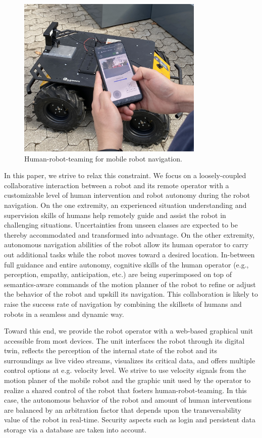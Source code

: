 \documentclass[letterpaper, 10 pt, conference]{ieeeconf}  %
\begin{document}
\begin{figure}[t]
	\centerline{\includegraphics[width=8.9cm]{images/galaxycontrol.jpg}}
	\caption{Human-robot-teaming for mobile robot navigation.}
	\label{fig:galaxycontrol}
\end{figure}


In this paper, we strive to relax this constraint. We focus on a loosely-coupled collaborative interaction between a  robot and its remote operator  with a customizable level of human intervention and robot autonomy during the robot navigation. On the one extremity, an experienced situation understanding and  supervision skills of humans help remotely guide and assist the robot in challenging situations. Uncertainties from unseen classes are expected to be thereby accommodated and transformed into advantage. On the other extremity, autonomous navigation abilities of the robot allow its human operator to carry out additional tasks while the robot moves toward a desired location. In-between full guidance and entire autonomy, cognitive skills of the human operator (e.g., perception, empathy, anticipation, etc.) are being superimposed on top of semantics-aware commands of the motion planner of the robot to refine or adjust the behavior of the robot and upskill its navigation. This collaboration is likely to raise the success rate of  navigation by combining the skillsets of humans and robots in a seamless and dynamic way.



Toward this end, we  provide the robot operator with a web-based graphical unit accessible from most devices. The unit interfaces the robot through its digital twin, reflects the perception of the internal state of the robot and its surroundings as live video streams, visualizes its critical data, and offers multiple control options at e.g. velocity level. We strive to use  velocity signals from the motion planer of the mobile robot and the graphic unit used by the operator to realize a shared control \cite{phri} of the robot that fosters human-robot-teaming. In this case, the  autonomous behavior of the robot and amount of human interventions are  balanced by an arbitration factor that depends upon the transversability value of the robot in real-time. Security aspects such as login and persistent data storage via a database are  taken into account. 
\end{document}
